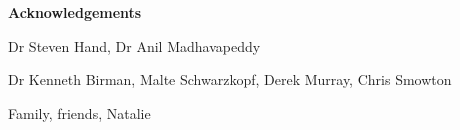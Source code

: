 \newpage
{\Huge \bf Acknowledgements}

\vspace{24pt} 

Dr Steven Hand, Dr Anil Madhavapeddy

Dr Kenneth Birman, Malte Schwarzkopf, Derek Murray, Chris Smowton

Family, friends, Natalie

\vfill

\newpage
\vspace*{\fill}
